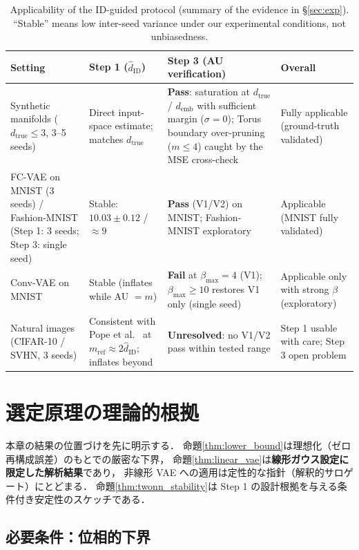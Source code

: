 \documentclass[11pt,a4paper]{jsarticle}
\newcommand{\hatdID}{\hat{d}_{\mathrm{ID}}}
\newcommand{\dtrue}{d_{\mathrm{true}}}
\newcommand{\demb}{d_{\mathrm{emb}}}
\begin{document}
\begin{table}[H]
\centering
\caption{Applicability of the ID-guided protocol (summary of the evidence in
§\ref{sec:exp}). ``Stable'' means low inter-seed variance under our
experimental conditions, not unbiasedness.}
\label{tab:applicability}
\small
\begin{tabular}{p{3.0cm}p{3.2cm}p{3.4cm}p{4.2cm}}
\toprule
Setting & Step 1 ($\hatdID$) & Step 3 (AU verification) & Overall \\
\midrule
Synthetic manifolds ($\dtrue \leq 3$, 3--5 seeds) & Direct input-space estimate; matches $\dtrue$ & \textbf{Pass}: saturation at $\dtrue$ / $\demb$ with sufficient margin ($\sigma = 0$); Torus boundary over-pruning ($m \leq 4$) caught by the MSE cross-check & Fully applicable (ground-truth validated) \\
\addlinespace
FC-VAE on MNIST (3 seeds) / Fashion-MNIST (Step 1: 3 seeds; Step 3: single seed) & Stable: $10.03 \pm 0.12$ / $\approx 9$ & \textbf{Pass} (V1/V2) on MNIST; Fashion-MNIST exploratory & Applicable (MNIST fully validated) \\
\addlinespace
Conv-VAE on MNIST & Stable (inflates while AU $= m$) & \textbf{Fail} at $\beta_{\max} = 4$ (V1); $\beta_{\max} \geq 10$ restores V1 only (single seed) & Applicable only with strong $\beta$ (exploratory) \\
\addlinespace
Natural images (CIFAR-10 / SVHN, 3 seeds) & Consistent with Pope et al.~\cite{pope2021intrinsic} at $m_{\mathrm{ref}} \approx 2\hatdID$; inflates beyond & \textbf{Unresolved}: no V1/V2 pass within tested range & Step 1 usable with care; Step 3 open problem \\
\bottomrule
\end{tabular}
\end{table}

\section{選定原理の理論的根拠}\label{sec:theory}

本章の結果の位置づけを先に明示する．
命題\ref{thm:lower_bound}は理想化（ゼロ再構成誤差）のもとでの厳密な下界，
命題\ref{thm:linear_vae}は\textbf{線形ガウス設定に限定した解析結果}であり，
非線形 VAE への適用は定性的な指針（解釈的サロゲート）にとどまる．
命題\ref{thm:twonn_stability}は Step 1 の設計根拠を与える条件付き安定性のスケッチである．

\subsection{必要条件：位相的下界}\label{sec:theory_lower}
\end{document}
